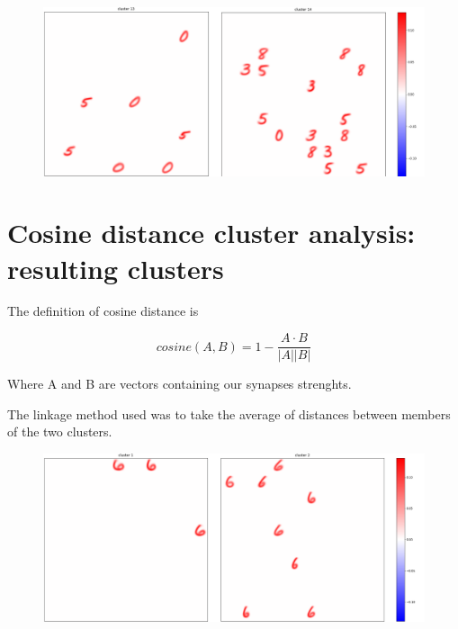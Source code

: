 \documentclass[a4paper]{report}
\begin{document}
\begin{figure} [H]
    \centering
    \includegraphics [width=\textwidth ] {c/e/13.png}
    \caption{}
\end{figure}

\chapter{Cosine distance cluster analysis: resulting clusters}

The definition of cosine distance is

\begin{equation}
    cosine(A,B) = 1 - \frac{A \cdot B}{|A||B|}
\end{equation}

Where A and B are vectors containing our synapses strenghts.

The linkage method used was to take the average of distances between members of the two clusters.

\begin{figure} [H]
    \centering
    \includegraphics [width=\textwidth ] {c/c/1.png}
    \caption{}
\end{figure}
\end{document}
